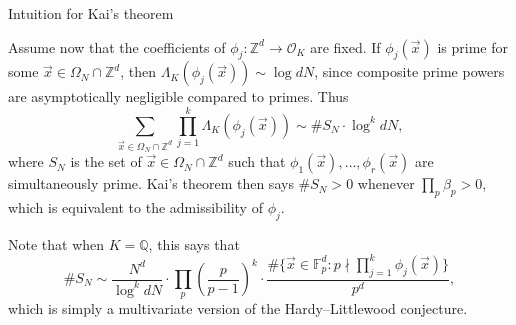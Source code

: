\documentclass[10pt]{beamer}
\begin{document}
\begin{frame}[t]{Intuition for Kai's theorem}

Assume now that the coefficients of $ \phi_j : \mathbb{Z}^d \to \mathcal{O}_K $ are fixed. If $ \phi_j(\vec{x}) $ is prime for some $ \vec{x} \in \Omega_N \cap \mathbb{Z}^d $, then $ \Lambda_K(\phi_j(\vec{x})) \sim \log dN $, since composite prime powers are asymptotically negligible compared to primes. Thus
$$ \sum_{\vec{x} \in \Omega_N \cap \mathbb{Z}^d} \prod_{j = 1}^k \Lambda_K(\phi_j(\vec{x})) \sim \#S_N \cdot \log^k dN, $$
where $ S_N $ is the set of $ \vec{x} \in \Omega_N \cap \mathbb{Z}^d $ such that $ \phi_1(\vec{x}), \dots, \phi_r(\vec{x}) $ are simultaneously prime. Kai's theorem then says $ \#S_N > 0 $ whenever $ \prod_p \beta_p > 0 $, which is equivalent to the admissibility of $ \phi_j $.

\vspace{0.5cm} Note that when $ K = \mathbb{Q} $, this says that
$$ \#S_N \sim \dfrac{N^d}{\log^k dN} \cdot \prod_p \left(\dfrac{p}{p - 1}\right)^k \cdot \dfrac{\#\{\vec{x} \in \mathbb{F}_p^d : p \nmid \prod_{j = 1}^k \phi_j(\vec{x})\}}{p^d}, $$
which is simply a multivariate version of the Hardy--Littlewood conjecture.

\end{frame}
\end{document}
